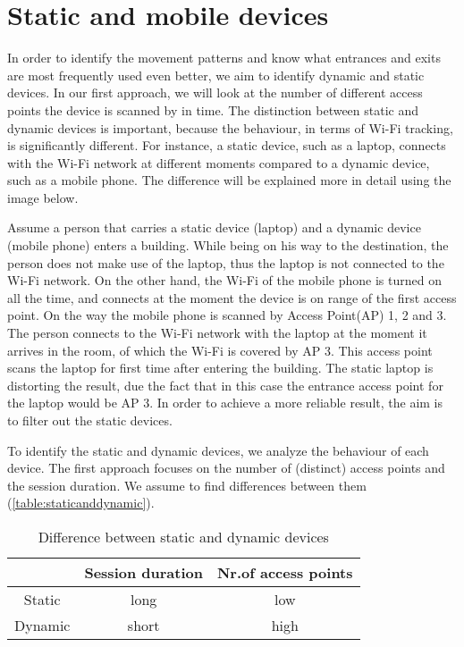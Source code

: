 \section{Static and mobile devices}\label{Static and mobile devices}

In order to identify the movement patterns and know what entrances and exits are most frequently used even better, we aim to identify dynamic and static devices. In our first approach, we will look at the number of different access points the device is scanned by in time. The distinction between static and dynamic devices is important, because the behaviour, in terms of Wi-Fi tracking, is significantly different. For instance, a static device, such as a laptop, connects with the Wi-Fi network at different moments compared to a dynamic device, such as a mobile phone. The difference will be explained more in detail using the image below. 

Assume a person that carries a static device (laptop) and a dynamic device (mobile phone) enters a building. While being on his way to the destination, the person does not make use of the laptop, thus the laptop is not connected to the Wi-Fi network. On the other hand, the Wi-Fi of the mobile phone is turned on all the time, and connects at the moment the device is on range of the first access point. On the way the mobile phone is scanned by Access Point(AP) 1, 2 and 3. The person connects to the Wi-Fi network with the laptop at the moment it arrives in the room, of which the Wi-Fi is covered by AP 3. This access point scans the laptop for first time after entering the building. The static laptop is distorting the result, due the fact that in this case the entrance access point for the laptop would be AP 3. In order to achieve a more reliable result, the aim is to filter out the static devices.

To identify the static and dynamic devices, we analyze the behaviour of each device. The first approach focuses on the number of (distinct) access points and the session duration. We assume to find differences between them (\autoref{table:staticanddynamic}). 

\begin{table}[H]
\centering
\begin{tabular}{|c|c|c|}
\hline 
 & Session duration & Nr.of access points \\
\hline
Static & long & low \\
\hline
Dynamic & short & high \\
\hline	
\end{tabular}
\captionsetup{justification=centering}
\caption{Difference between static and dynamic devices}
\label{table:staticanddynamic}
\end{table}

